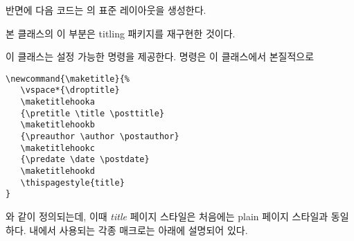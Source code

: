 \documentclass[10pt,a4paper]{oblivoir}
\renewcommand{\maketitlehooka}{%
  \par\begin{flushright}\puB\end{flushright}}
\begin{document}
반면에 다음 코드는 \cmd{\maketitle}의 표준 레이아웃을 생성한다.

본 클래스의 이 부분은 \textsf{titling} 패키지를 재구현한 것이다.

이 클래스는 설정 가능한 \cmd{\maketitle} 명령을 제공한다.
\cmd{\maketitle} 명령은 이 클래스에서 본질적으로
\begin{verbatim}
\newcommand{\maketitle}{%
   \vspace*{\droptitle}
   \maketitlehooka
   {\pretitle \title \posttitle}
   \maketitlehookb
   {\preauthor \author \postauthor}
   \maketitlehookc
   {\predate \date \postdate}
   \maketitlehookd
   \thispagestyle{title}
}
\end{verbatim}
와 같이 정의되는데, 이때 \textsl{title} 페이지 스타일은 처음에는 \textsf{plain}
페이지 스타일과 동일하다.
\cmd{\maketitle} 내에서 사용되는 각종 매크로는 아래에 설명되어 있다.
\end{document}
